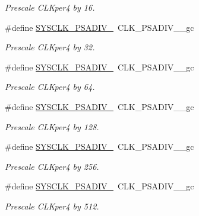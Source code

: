 \begin{DoxyCompactItemize}
\begin{DoxyCompactList}\small\item\em Prescale C\-L\-Kper4 by 16. \end{DoxyCompactList}\item 
\hypertarget{group__sysclk__group_gae54816aed8d1357a29b81c139e816137}{\#define \hyperlink{group__sysclk__group_gae54816aed8d1357a29b81c139e816137}{S\-Y\-S\-C\-L\-K\-\_\-\-P\-S\-A\-D\-I\-V\-\_}~C\-L\-K\-\_\-\-P\-S\-A\-D\-I\-V\-\_\-\_\-gc}\label{group__sysclk__group_gae54816aed8d1357a29b81c139e816137}

\begin{DoxyCompactList}\small\item\em Prescale C\-L\-Kper4 by 32. \end{DoxyCompactList}\item 
\hypertarget{group__sysclk__group_ga2851cc86bc4c0ae1487794bed0eeafd3}{\#define \hyperlink{group__sysclk__group_ga2851cc86bc4c0ae1487794bed0eeafd3}{S\-Y\-S\-C\-L\-K\-\_\-\-P\-S\-A\-D\-I\-V\-\_}~C\-L\-K\-\_\-\-P\-S\-A\-D\-I\-V\-\_\-\_\-gc}\label{group__sysclk__group_ga2851cc86bc4c0ae1487794bed0eeafd3}

\begin{DoxyCompactList}\small\item\em Prescale C\-L\-Kper4 by 64. \end{DoxyCompactList}\item 
\hypertarget{group__sysclk__group_gac310ecad318bfabac4e12e9d26fd9299}{\#define \hyperlink{group__sysclk__group_gac310ecad318bfabac4e12e9d26fd9299}{S\-Y\-S\-C\-L\-K\-\_\-\-P\-S\-A\-D\-I\-V\-\_}~C\-L\-K\-\_\-\-P\-S\-A\-D\-I\-V\-\_\-\_\-gc}\label{group__sysclk__group_gac310ecad318bfabac4e12e9d26fd9299}

\begin{DoxyCompactList}\small\item\em Prescale C\-L\-Kper4 by 128. \end{DoxyCompactList}\item 
\hypertarget{group__sysclk__group_ga13928e63a38dac7deeff7462eb9704d6}{\#define \hyperlink{group__sysclk__group_ga13928e63a38dac7deeff7462eb9704d6}{S\-Y\-S\-C\-L\-K\-\_\-\-P\-S\-A\-D\-I\-V\-\_}~C\-L\-K\-\_\-\-P\-S\-A\-D\-I\-V\-\_\-\_\-gc}\label{group__sysclk__group_ga13928e63a38dac7deeff7462eb9704d6}

\begin{DoxyCompactList}\small\item\em Prescale C\-L\-Kper4 by 256. \end{DoxyCompactList}\item 
\hypertarget{group__sysclk__group_ga1772eea4b1fda142fbf0d1edd7ca899c}{\#define \hyperlink{group__sysclk__group_ga1772eea4b1fda142fbf0d1edd7ca899c}{S\-Y\-S\-C\-L\-K\-\_\-\-P\-S\-A\-D\-I\-V\-\_}~C\-L\-K\-\_\-\-P\-S\-A\-D\-I\-V\-\_\-\_\-gc}\label{group__sysclk__group_ga1772eea4b1fda142fbf0d1edd7ca899c}

\begin{DoxyCompactList}\small\item\em Prescale C\-L\-Kper4 by 512. \end{DoxyCompactList}\end{DoxyCompactItemize}
